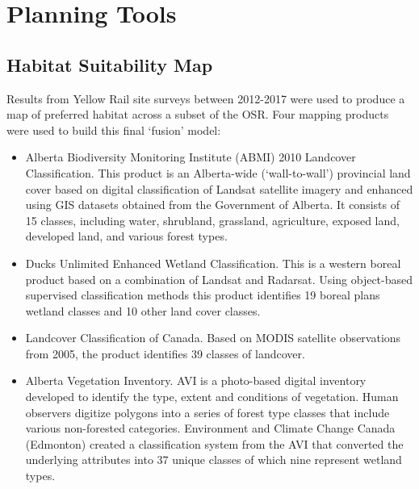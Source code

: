 \documentclass[11pt,]{article}
\providecommand{\tightlist}{%
  \setlength{\itemsep}{0pt}\setlength{\parskip}{0pt}}
\begin{document}
\section{Planning Tools}\label{planning-tools}

\subsection{Habitat Suitability Map}\label{habitat-suitability-map}

Results from Yellow Rail site surveys between 2012-2017 were used to
produce a map of preferred habitat across a subset of the OSR. Four
mapping products were used to build this final `fusion' model:

\begin{itemize}
\tightlist
\item
  Alberta Biodiversity Monitoring Institute (ABMI) 2010 Landcover
  Classification. This product is an Alberta-wide (`wall-to-wall')
  provincial land cover based on digital classification of Landsat
  satellite imagery and enhanced using GIS datasets obtained from the
  Government of Alberta. It consists of 15 classes, including water,
  shrubland, grassland, agriculture, exposed land, developed land, and
  various forest types.
\item
  Ducks Unlimited Enhanced Wetland Classification. This is a western
  boreal product based on a combination of Landsat and Radarsat. Using
  object-based supervised classification methods this product identifies
  19 boreal plans wetland classes and 10 other land cover classes.
\item
  Landcover Classification of Canada. Based on MODIS satellite
  observations from 2005, the product identifies 39 classes of
  landcover.
\item
  Alberta Vegetation Inventory. AVI is a photo-based digital inventory
  developed to identify the type, extent and conditions of vegetation.
  Human observers digitize polygons into a series of forest type classes
  that include various non-forested categories. Environment and Climate
  Change Canada (Edmonton) created a classification system from the AVI
  that converted the underlying attributes into 37 unique classes of
  which nine represent wetland types.
\end{itemize}
\end{document}
